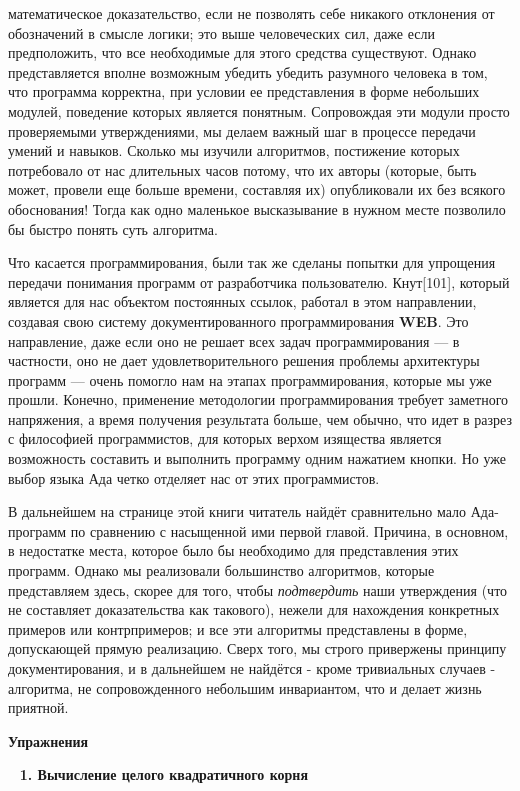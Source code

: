 \noindent математическое доказательство, если не позволять себе никакого отклонения от обозначений в смысле логики; это выше человеческих сил, даже если предположить, что все необходимые для этого средства существуют. Однако представляется вполне возможным убедить убедить разумного человека в том, что программа корректна, при условии ее представления в форме небольших модулей, поведение которых является понятным. Сопровождая эти модули просто проверяемыми утверждениями, мы делаем важный шаг в процессе передачи умений и навыков. Сколько мы изучили алгоритмов, постижение которых потребовало от нас длительных часов потому, что их авторы (которые, быть может, провели еще больше времени, составляя их) опубликовали их без всякого обоснования! Тогда как одно маленькое высказывание в нужном месте позволило бы быстро понять суть алгоритма. 

Что касается программирования, были так же сделаны попытки для упрощения передачи понимания программ от разработчика пользователю. Кнут[101], который является для нас объектом постоянных ссылок, работал в этом направлении, создавая свою систему документированного программирования \textbf{WEB}. Это направление, даже если оно не решает всех задач программирования --- в частности, оно не дает удовлетворительного решения проблемы архитектуры программ --- очень помогло нам на этапах программирования, которые мы уже прошли. Конечно, применение методологии программирования требует заметного напряжения, а время получения результата больше, чем обычно, что идет в разрез с философией программистов, для которых верхом изящества является возможность составить и выполнить программу одним нажатием кнопки. Но уже выбор языка Ада четко отделяет нас от этих программистов.

В дальнейшем на странице этой книги читатель найдёт сравнительно мало Ада-программ по сравнению с насыщенной ими первой главой. Причина, в основном, в недостатке места, которое было бы необходимо для представления этих программ. Однако мы реализовали большинство алгоритмов, которые представляем здесь, скорее для того, чтобы \textit{подтвердить} наши утверждения (что не составляет доказательства как такового), нежели для нахождения конкретных примеров или контрпримеров; и все эти алгоритмы представлены в форме, допускающей прямую реализацию. Сверх того, мы строго привержены принципу документирования, и в дальнейшем не найдётся - кроме тривиальных случаев - алгоритма, не сопровожденного небольшим инвариантом, что и делает жизнь приятной.
\newpage
\begin{center}
\cleartop
\textbf{\Large Упражнения}
\end{center}
\ \newline
\noindent\textbf {1. Вычисление целого квадратичного корня}\ \newline
\\

